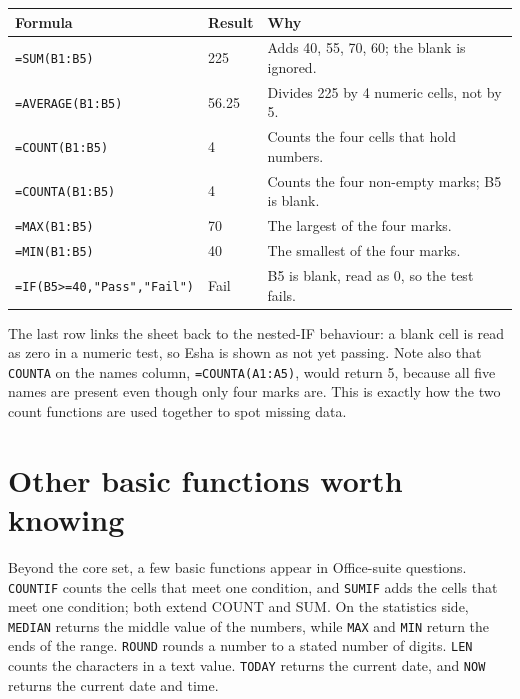 \begin{center}
\begin{tabular}{p{}p{}p{}}
\toprule
\textbf{Formula} & \textbf{Result} & \textbf{Why} \\
\midrule
\texttt{=SUM(B1:B5)} & 225 & Adds 40, 55, 70, 60; the blank is ignored. \\
\texttt{=AVERAGE(B1:B5)} & 56.25 & Divides 225 by 4 numeric cells, not by 5. \\
\texttt{=COUNT(B1:B5)} & 4 & Counts the four cells that hold numbers. \\
\texttt{=COUNTA(B1:B5)} & 4 & Counts the four non-empty marks; B5 is blank. \\
\texttt{=MAX(B1:B5)} & 70 & The largest of the four marks. \\
\texttt{=MIN(B1:B5)} & 40 & The smallest of the four marks. \\
\texttt{=IF(B5>=40,"Pass","Fail")} & Fail & B5 is blank, read as 0, so the test fails. \\
\bottomrule
\end{tabular}
\end{center}

The last row links the sheet back to the nested-IF behaviour: a blank cell is
read as zero in a numeric test, so Esha is shown as not yet passing. Note also
that \texttt{COUNTA} on the names column, \texttt{=COUNTA(A1:A5)}, would
return 5, because all five names are present even though only four marks are.
This is exactly how the two count functions are used together to spot missing
data.

\section{Other basic functions worth knowing}
Beyond the core set, a few basic functions appear in Office-suite questions.
\texttt{COUNTIF} counts the cells that meet one condition, and \texttt{SUMIF}
adds the cells that meet one condition; both extend COUNT and SUM. On the
statistics side, \texttt{MEDIAN} returns the middle value of the numbers,
while \texttt{MAX} and \texttt{MIN} return the ends of the range.
\texttt{ROUND} rounds a number to a stated number of digits. \texttt{LEN}
counts the characters in a text value. \texttt{TODAY} returns the current
date, and \texttt{NOW} returns the current date and time.

